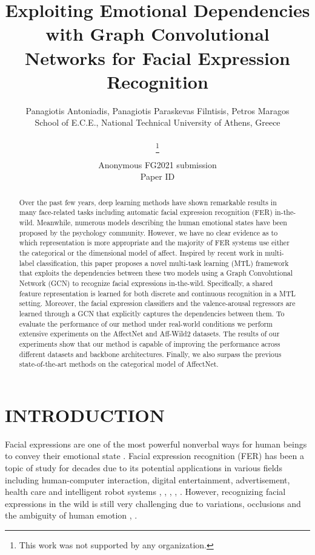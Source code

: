 \documentclass[a4paper, 10pt, conference]{ieeeconf}      \usepackage{FG2021}
\title{\LARGE \bf
Exploiting Emotional Dependencies with Graph Convolutional Networks for Facial Expression Recognition
}
\author{\parbox{16cm}{\centering
    {\large Panagiotis Antoniadis, Panagiotis Paraskevas Filntisis, Petros Maragos}\\
    {\normalsize
    School of E.C.E., National Technical University of Athens, Greece\\}}
    \thanks{This work was not supported by any organization.}}
\begin{document}
\ifFGfinal
\thispagestyle{empty}
\pagestyle{empty}
\else
\author{Anonymous FG2021 submission\\ Paper ID \FGPaperID \\}
\pagestyle{plain}
\fi
\maketitle

\begin{abstract}
Over the past few years, deep learning methods have shown remarkable results in many face-related tasks including automatic facial expression recognition (FER) in-the-wild. Meanwhile, numerous models describing the human emotional states have been proposed by the psychology community. However, we have no clear evidence as to which representation is more appropriate and the majority of FER systems use either the categorical or the dimensional model of affect. Inspired by recent work in multi-label classification, this paper proposes a novel multi-task learning (MTL) framework that exploits the dependencies between these two models using a Graph Convolutional Network (GCN) to recognize facial expressions in-the-wild. Specifically, a shared feature representation is learned for both discrete and continuous recognition in a MTL setting. Moreover, the facial expression classifiers and the valence-arousal regressors are learned through a GCN that explicitly captures the dependencies between them. To evaluate the performance of our method under real-world conditions we perform extensive experiments on the AffectNet and Aff-Wild2 datasets. The results of our experiments show that our method is capable of improving the performance across different datasets and backbone architectures. Finally, we  also surpass the previous state-of-the-art methods on the categorical model of AffectNet.
\end{abstract}

\section{INTRODUCTION}
\label{sec:introduction}

Facial expressions are one of the most powerful nonverbal ways for human beings to convey their emotional state \cite{darwin2015expression}. Facial expression recognition (FER) has been a topic of study for decades due to its potential applications in various fields including human-computer interaction, digital entertainment, advertisement, health care and intelligent robot systems \cite{corneanu2016survey}, \cite{blom2014towards}, \cite{mcduff2014predicting}, \cite{muhammad2017facial}, \cite{filntisis2019fusing}. However, recognizing facial expressions in the wild is still very challenging due to variations, occlusions and the ambiguity of human emotion \cite{li2020deep}, \cite{valstar2011first}.
\end{document}
